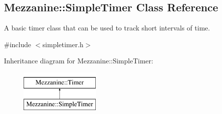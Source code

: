 \hypertarget{classMezzanine_1_1SimpleTimer}{
\subsection{Mezzanine::SimpleTimer Class Reference}
\label{classMezzanine_1_1SimpleTimer}
}


A basic timer class that can be used to track short intervals of time.  




{\ttfamily \#include $<$simpletimer.h$>$}

Inheritance diagram for Mezzanine::SimpleTimer:\begin{figure}[H]
\begin{center}
\leavevmode
\includegraphics[height=2.000000cm]{classMezzanine_1_1SimpleTimer}
\end{center}
\end{figure}
